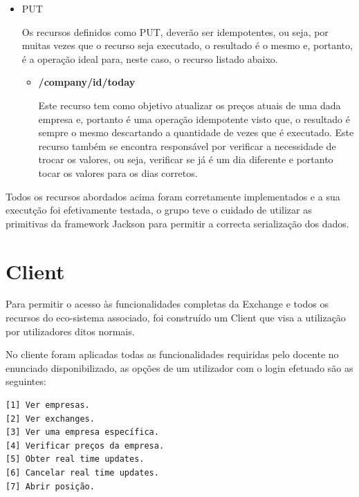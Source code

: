 \documentclass[a4paper,12pt]{article}
\begin{document}
\begin{itemize}
\begin{itemize}
    
  \end{itemize}
\item PUT
  \par Os recursos definidos como PUT, deverão ser idempotentes, ou seja, por muitas vezes que o recurso seja executado, o resultado é o mesmo e, portanto, é a operação ideal para, neste caso, o recurso listado abaixo.
  \begin{itemize}
    \item \textbf{/company/{id}/today}

    \par Este recurso tem como objetivo atualizar os preços atuais de uma dada empresa e, portanto é uma operação idempotente visto que, o resultado é sempre o mesmo descartando a quantidade de vezes que é executado. Este recurso também se encontra responsável por verificar a necessidade de trocar os valores, ou seja, verificar se já é um dia diferente e portanto tocar os valores para os dias corretos.
  \end{itemize}
\end{itemize}

\par Todos os recursos abordados acima foram corretamente implementados e a sua executção foi efetivamente testada, o grupo teve o cuidado de utilizar as primitivas da framework Jackson para permitir a correcta serialização dos dados.

\section{Client}
Para permitir o acesso às funcionalidades completas da Exchange e todos os recursos do eco-sistema associado, foi construído um Client que visa a utilização por utilizadores ditos normais.
\par No cliente foram aplicadas todas as funcionalidades requiridas pelo docente no enunciado disponibilizado, as opções de um utilizador com o login efetuado são as seguintes:
\begin{verbatim}
[1] Ver empresas.
[2] Ver exchanges.
[3] Ver uma empresa específica.
[4] Verificar preços da empresa.
[5] Obter real time updates.
[6] Cancelar real time updates.
[7] Abrir posição.
\end{verbatim}
\end{document}
